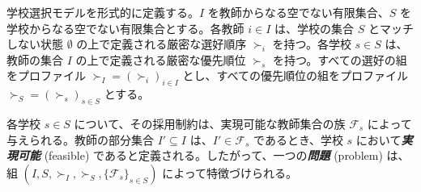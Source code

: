 \documentclass[12pt, a4paper]{article}
\theoremstyle{definition}
\theoremstyle{remark}
\theoremstyle{plain}
\begin{document}











学校選択モデルを形式的に定義する。$I$ を教師からなる空でない有限集合、$S$ を学校からなる空でない有限集合とする。各教師 $i \in I$ は、学校の集合 $S$ とマッチしない状態 $\emptyset$ の上で定義される厳密な選好順序 $\succ_i$ を持つ。各学校 $s \in S$ は、教師の集合 $I$ の上で定義される厳密な優先順位 $\succ_s$ を持つ。すべての選好の組をプロファイル $\succ_I = (\succ_i)_{i \in I}$ とし、すべての優先順位の組をプロファイル $\succ_S = (\succ_s)_{s \in S}$ とする。

各学校 $s \in S$ について、その採用制約は、実現可能な教師集合の族 $\mathcal{F}_s$ によって与えられる。教師の部分集合 $I' \subseteq I$ は、$I' \in \mathcal{F}_s$ であるとき、学校 $s$ において\textbf{\textit{実現可能}} (feasible) であると定義される。したがって、一つの\textbf{\textit{問題}} (problem) は、組 $(I, S, \succ_I, \succ_S, \{\mathcal{F}_s\}_{s \in S})$ によって特徴づけられる。
\end{document}

